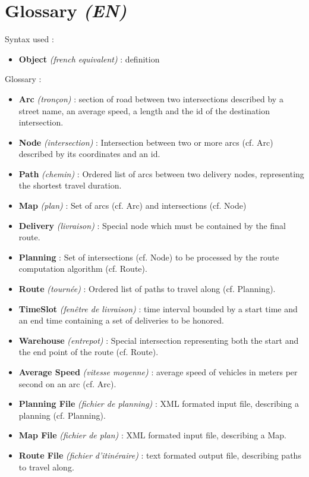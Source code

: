 \documentclass[paper=a4, fontsize=11pt]{report}
\numberwithin{equation}{section}		%
\numberwithin{figure}{section}		%
\numberwithin{table}{section}		%
\renewcommand{\bf}[1]{\textbf{#1}}
\renewcommand{\it}[1]{\textit{#1}}
\begin{document}
\section{Glossary \it{(EN)}}
\label{sec:glossary}

Syntax used :
\begin{itemize}
	\item[\textbullet] \bf{Object} \it{(french equivalent)} : definition \\
\end{itemize}

Glossary : 
\begin{itemize}
	\item[\textbullet] \bf{Arc} \it{(tronçon)} : section of road between two intersections described by a street name, an average speed, a length and the id of the destination intersection.
	\item[\textbullet] \bf{Node} \it{(intersection)} : Intersection between two or more arcs (cf. Arc) described by its coordinates and an id.
	\item[\textbullet] \bf{Path} \it{(chemin)} : Ordered list of arcs between two delivery nodes, representing the shortest travel duration.
	\item[\textbullet] \bf{Map} \it{(plan)} : Set of arcs (cf. Arc) and intersections (cf. Node)
	\item[\textbullet] \bf{Delivery} \it{(livraison)} : Special node which must be contained by the final route.
	\item[\textbullet] \bf{Planning} : Set of intersections (cf. Node) to be processed by the route computation algorithm (cf. Route).
	\item[\textbullet] \bf{Route} \it{(tournée)} : Ordered list of paths to travel along (cf. Planning). 
	\item[\textbullet] \bf{TimeSlot} \it{(fenêtre de livraison)} : time interval bounded by a start time and an end time containing a set of deliveries to be honored.
	\item[\textbullet] \bf{Warehouse} \it{(entrepot)} : Special intersection representing both the start and the end point of the route (cf. Route).
	\item[\textbullet] \bf{Average Speed} \it{(vitesse moyenne)} : average speed of vehicles in meters per second on an arc (cf. Arc).
	\item[\textbullet] \bf{Planning File} \it{(fichier de planning)} : XML formated input file, describing a planning (cf. Planning).
	\item[\textbullet] \bf{Map File} \it{(fichier de plan)} : XML formated input file, describing a Map.
	\item[\textbullet] \bf{Route File} \it{(fichier d’itinéraire)} : text formated output file, describing paths to travel along.
\end{itemize}
\end{document}
